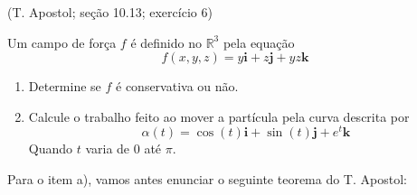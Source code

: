 \documentclass[../main.tex]{subfiles}
\begin{document}
	\begin{exercicio}{3}
		(T. Apostol; seção 10.13; exercício 6)
		
		Um campo de força $f$ é definido no $\mathbb{R}^3$ pela equação
		\[
		f(x,y,z)=y\textbf{i} + z\textbf{j} +yz\textbf{k}
		\]
		\begin{enumerate}[label=\alph*)]
			\item Determine se $f$ é conservativa ou não.
			\item Calcule o trabalho feito ao mover a partícula pela curva descrita por
			\[
			\alpha(t)=\cos(t)\textbf{i}+\sin(t)\textbf{j}+e^t\textbf{k}
			\]
			Quando $t$ varia de $0$ até $\pi$.
		\end{enumerate}
	\end{exercicio}
	\begin{solucao}
		Para o item a), vamos antes enunciar o seguinte teorema do T. Apostol:
		\begin{teorema}
			

\end{teorema}
\end{solucao}
\end{document}
